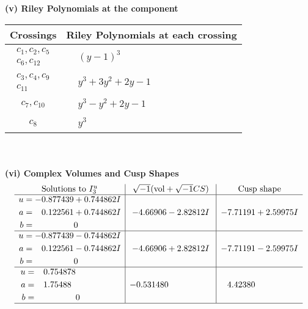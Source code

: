 \documentclass[1p]{elsarticle_modified}
\theoremstyle{definition}
\newcommand{\I}{\sqrt{-1}}
\begin{document}
\newpage\renewcommand{\arraystretch}{1}
\flushleft \textbf{(v) Riley Polynomials at the component}\newline \\
\begin{tabular}{m{50pt}|m{274pt}}
Crossings & \hspace{64pt}Riley Polynomials at each crossing \\
\hline $$\begin{aligned}c_{1},c_{2},c_{5}\\c_{6},c_{12}\end{aligned}$$&$\begin{aligned}
&(y-1)^3
\end{aligned}$\\
\hline $$\begin{aligned}c_{3},c_{4},c_{9}\\c_{11}\end{aligned}$$&$\begin{aligned}
&y^3+3 y^2+2 y-1
\end{aligned}$\\
\hline $$\begin{aligned}c_{7},c_{10}\end{aligned}$$&$\begin{aligned}
&y^3- y^2+2 y-1
\end{aligned}$\\
\hline $$\begin{aligned}c_{8}\end{aligned}$$&$\begin{aligned}
&y^3
\end{aligned}$\\
\hline
\end{tabular}\\~\\
\newpage\flushleft \textbf{(vi) Complex Volumes and Cusp Shapes}
$$\begin{array}{c|c|c}  
\text{Solutions to }I^u_{3}& \I (\text{vol} + \sqrt{-1}CS) & \text{Cusp shape}\\
 \hline 
\begin{aligned}
u &= -0.877439 + 0.744862 I \\
a &= \phantom{-}0.122561 + 0.744862 I \\
b &= \phantom{-0.000000 } 0\end{aligned}
 & -4.66906 - 2.82812 I & -7.71191 + 2.59975 I \\ \hline\begin{aligned}
u &= -0.877439 - 0.744862 I \\
a &= \phantom{-}0.122561 - 0.744862 I \\
b &= \phantom{-0.000000 } 0\end{aligned}
 & -4.66906 + 2.82812 I & -7.71191 - 2.59975 I \\ \hline\begin{aligned}
u &= \phantom{-}0.754878\phantom{ +0.000000I} \\
a &= \phantom{-}1.75488\phantom{ +0.000000I} \\
b &= \phantom{-0.000000 } 0\end{aligned}
 & -0.531480\phantom{ +0.000000I} & \phantom{-}4.42380\phantom{ +0.000000I}\\
 \hline 
 \end{array}$$\newpage
\end{document}
